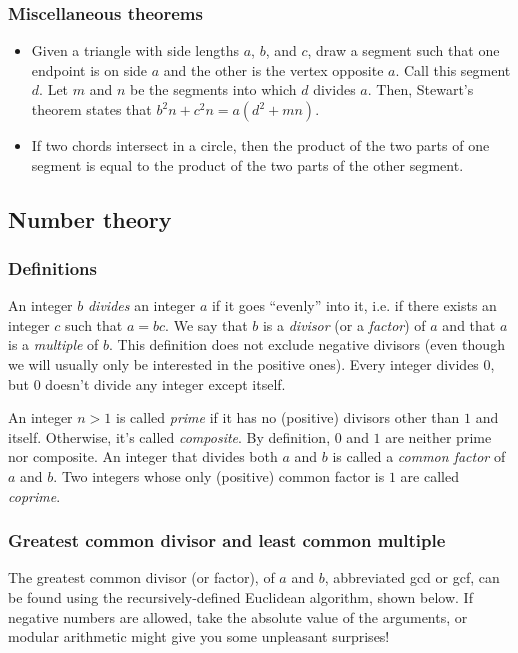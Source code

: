 \documentclass[a4paper,12pt]{article}
\begin{document}
\subsubsection{Miscellaneous theorems}
\begin{itemize}
\item Given a triangle with side lengths $a$, $b$, and $c$, draw a segment such that one endpoint is on side $a$ and the other is the vertex opposite $a$. Call this segment $d$. Let $m$ and $n$ be the segments into which $d$ divides $a$. Then, Stewart's theorem states that $b^2n+c^2n = a(d^2 + mn)$.
\item If two chords intersect in a circle, then the product of the two parts of one segment is equal to the product of the two parts of the other segment.
\end{itemize}

\subsection{Number theory}

\subsubsection{Definitions}

An integer $b$ {\em divides} an integer $a$ if it goes ``evenly'' into it, i.e. if there exists an integer $c$ such that $a=bc$. We say that $b$ is a {\em divisor} (or a {\em factor}) of $a$ and that $a$ is a {\em multiple} of $b$. This definition does not exclude negative divisors (even though we will usually only be interested in the positive ones). Every integer divides $0$, but $0$ doesn't divide any integer except itself.

An integer $n>1$ is called {\em prime} if it has no (positive) divisors other than $1$ and itself. Otherwise, it's called {\em composite}. By definition, $0$ and $1$ are neither prime nor composite. An integer that divides both $a$ and $b$ is called a {\em common factor} of $a$ and $b$. Two integers whose only (positive) common factor is $1$ are called {\em coprime}.

\subsubsection{Greatest common divisor and least common multiple}

\noindent The greatest common divisor (or factor), of $a$ and $b$, abbreviated gcd or gcf, can be found using the recursively-defined Euclidean algorithm, shown below. If negative numbers are allowed, take the absolute value of the arguments, or modular arithmetic might give you some unpleasant surprises!
\end{document}
